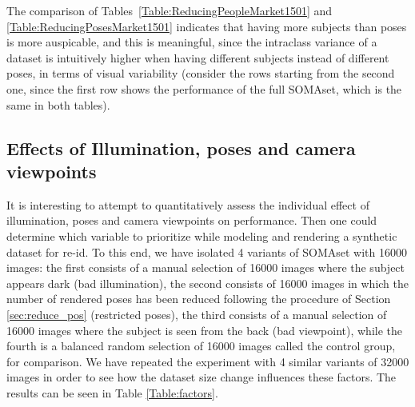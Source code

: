 \documentclass[10pt,journal,letterpaper,compsoc]{IEEEtran}
\begin{document}
The comparison of Tables~\ref{Table:ReducingPeopleMarket1501} and \ref{Table:ReducingPosesMarket1501} indicates that having more subjects than poses is more auspicable, and this is meaningful, since the intraclass variance of a dataset is intuitively higher when having different subjects instead of different poses, in terms of visual variability (consider the rows starting from the second one, since the first row shows the performance of the full SOMAset, which is the same in both tables).



\subsection{Effects of Illumination, poses and camera viewpoints}

It is interesting to attempt to quantitatively assess the individual effect of illumination, poses and camera viewpoints on performance. Then one could determine which variable to prioritize while modeling and rendering a synthetic dataset for re-id. To this end, we have isolated 4 variants of SOMAset with 16000 images: the first consists of a manual selection of 16000 images where the subject appears dark (bad illumination), the second consists of 16000 images in which the number of rendered poses has been reduced following the procedure of Section \ref{sec:reduce_pos} (restricted poses),  the third consists of a manual selection of 16000 images where the subject is seen from the back (bad viewpoint), while the fourth is a balanced random selection of 16000 images called the control group, for comparison. We have repeated the experiment with 4 similar variants of 32000 images in order to see how the dataset size change influences these factors. The results can be seen in Table \ref{Table:factors}.
\end{document}
